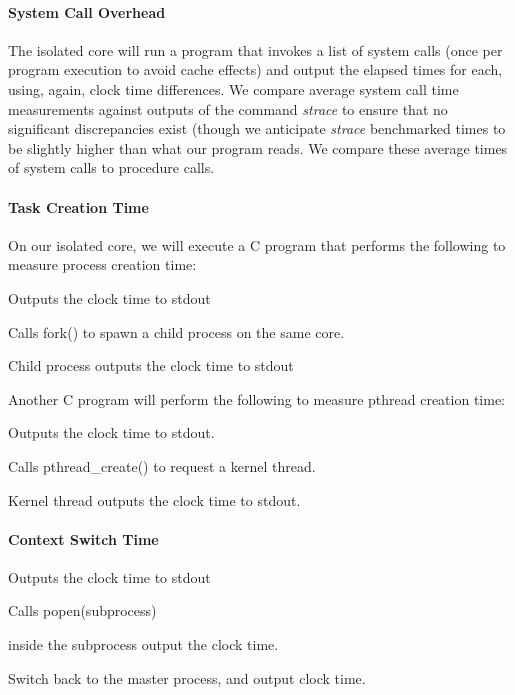 \documentclass{article}
\begin{document}
\paragraph{System Call Overhead}

The isolated core will run a program that invokes a list of system calls (once per program execution to avoid cache effects) and 
output the elapsed times for each, using, again, clock time differences. We compare average system 
call time measurements against outputs of the command \textit{strace} to ensure that no significant 
discrepancies exist (though we anticipate \textit{strace} benchmarked times to be slightly higher than what our program reads. 
We compare these average times of system calls to procedure calls.

\paragraph{Task Creation Time}

On our isolated core, we will execute a C program that performs the following to measure process creation time:
\begin{compactitem}
  \item Outputs the clock time to stdout
  \item Calls fork() to spawn a child process on the same core.
  \item Child process outputs the clock time to stdout
\end{compactitem}

\noindent{}Another C program will perform the following to measure pthread creation time:
\begin{compactitem}
  \item Outputs the clock time to stdout.
  \item Calls pthread\_create() to request a kernel thread.
  \item Kernel thread outputs the clock time to stdout.
\end{compactitem}

\paragraph{Context Switch Time}

\begin{compactitem}
  \item Outputs the clock time to stdout
  \item Calls popen(subprocess)
  \item inside the subprocess output the clock time.
  \item Switch back to the master process, and output clock time.
\end{compactitem}
\end{document}
